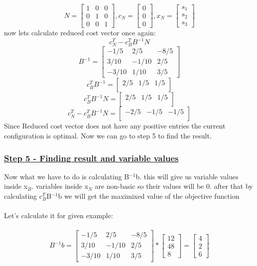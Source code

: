 \[
N=\begin{bmatrix}
1&0&0\\
0&1&0\\
0&0&1
\end{bmatrix}
,c_N=\begin{bmatrix}
0\\
0\\
0
\end{bmatrix}
,x_N=\begin{bmatrix}
s_1\\
s_2\\
s_3
\end{bmatrix}
\]
now lets calculate reduced cost vector once again:
\[c_N^T-c_B^TB^{-1}N\]
\[
B^{-1}=
\begin{bmatrix}
-1/5  &2/5&-8/5\\
3/10 &-1/10&2/5\\
-3/10 &1/10&3/5
\end{bmatrix}
\]
\[
c_B^TB^{-1}=
\begin{bmatrix}
2/5&1/5&1/5\\
\end{bmatrix}
\]
\[
c_B^TB^{-1}N=\begin{bmatrix}
2/5&1/5&1/5\\
\end{bmatrix}
\]
\[c_N^T-c_B^TB^{-1}N=
\begin{bmatrix}
-2/5&-1/5&-1/5\\
\end{bmatrix}
\]
Since Reduced cost vector does not have any positive entries the current configuration is optimal. Now we can go to step 5 to find the result.

\subsubsection{\underline{Step 5 - Finding result and variable values}}
Now what we have to do is calculating B$^{-1}$b. this will give us variable values inside x$_B$. variables inside x$_N$ are non-basic so their values will be 0. after that by calculating c$_B^T$B$^{-1}$b we will get the maximixed value of the objective function\\
\\
Let's calculate it for given example:\\
\\
\[
B^{-1}b=
\begin{bmatrix}
-1/5  &2/5&-8/5\\
3/10 &-1/10&2/5\\
-3/10 &1/10&3/5
\end{bmatrix}
*
\begin{bmatrix}
12\\
48\\
8
\end{bmatrix}
=
\begin{bmatrix}
4\\
2\\
6
\end{bmatrix}
\]


